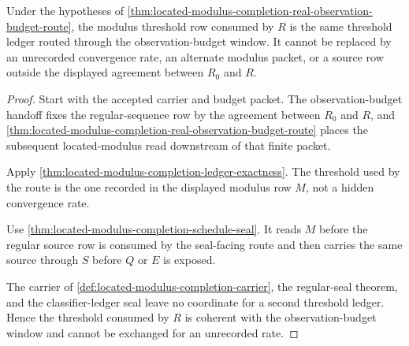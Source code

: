 \begin{theorem}
\label{thm:located-modulus-completion-threshold-source-coherence}
Under the hypotheses of \autoref{thm:located-modulus-completion-real-observation-budget-route}, the modulus threshold row consumed by $R$ is the same threshold ledger routed through the observation-budget window. It cannot be replaced by an unrecorded convergence rate, an alternate modulus packet, or a source row outside the displayed agreement between $R_0$ and $R$.
\end{theorem}
\begin{proof}
Start with the accepted carrier and budget packet. The observation-budget handoff fixes the regular-sequence row by the agreement between $R_0$ and $R$, and \autoref{thm:located-modulus-completion-real-observation-budget-route} places the subsequent located-modulus read downstream of that finite packet.

Apply \autoref{thm:located-modulus-completion-ledger-exactness}. The threshold used by the route is the one recorded in the displayed modulus row $M$, not a hidden convergence rate.

Use \autoref{thm:located-modulus-completion-schedule-seal}. It reads $M$ before the regular source row is consumed by the seal-facing route and then carries the same source through $S$ before $Q$ or $E$ is exposed.

The carrier of \autoref{def:located-modulus-completion-carrier}, the regular-seal theorem, and the classifier-ledger seal leave no coordinate for a second threshold ledger. Hence the threshold consumed by $R$ is coherent with the observation-budget window and cannot be exchanged for an unrecorded rate.
\end{proof}

